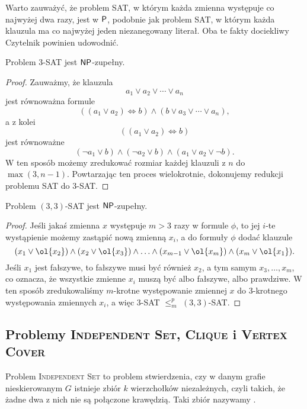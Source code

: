 Warto zauważyć, że problem SAT, w którym każda zmienna występuje co najwyżej dwa razy, jest w $\textsf{P}$, podobnie jak problem SAT, w którym każda klauzula ma co najwyżej jeden niezanegowany literał. Oba te fakty dociekliwy Czytelnik powinien udowodnić.

\begin{theorem}\label{t:3-SAT}
    Problem 3-SAT jest $\textsf{NP}$-zupełny.
\end{theorem}
\begin{proof}
    Zauważmy, że klauzula
    \[ a_1 \lor a_2 \lor \cdots \lor a_n \]
    jest równoważna formule
    \[ ((a_1 \lor a_2) \Leftrightarrow b) \land (b \lor a_3 \lor \cdots \lor a_n), \]
    a z kolei
    \[ ((a_1 \lor a_2) \Leftrightarrow b) \]
    jest równoważne
    \[ (\neg a_1 \lor b) \land (\neg a_2 \lor b) \land (a_1 \lor a_2 \lor \neg b). \]
    W ten sposób możemy zredukować rozmiar każdej klauzuli z $n$ do $\max(3, n-1)$. Powtarzając ten proces wielokrotnie, dokonujemy redukcji problemu SAT do 3-SAT.
\end{proof}

\begin{theorem}\label{t:3,3-SAT}
    Problem $(3, 3)$-SAT jest $\textsf{NP}$-zupełny.
\end{theorem}
\begin{proof}
    Jeśli jakaś zmienna $x$ występuje $m > 3$ razy w formule $\phi$, to jej $i$-te wystąpienie możemy zastąpić nową zmienną $x_i$, a do formuły $\phi$ dodać klauzule
    \[ (x_1 \lor \ol{x_2}) \land (x_2 \lor \ol{x_3}) \land \ldots \land (x_{m-1} \lor \ol{x_m}) \land (x_m \lor \ol{x_1}). \]
    Jeśli $x_1$ jest fałszywe, to fałszywe musi być również $x_2$, a tym samym $x_3, \ldots, x_m$, co oznacza, że wszystkie zmienne $x_i$ muszą być albo fałszywe, albo prawdziwe. W ten sposób zredukowaliśmy $m$-krotne występowanie zmiennej $x$ do 3-krotnego występowania zmiennych $x_i$, a więc 3-SAT $\leq_m^p$ $(3, 3)$-SAT.
\end{proof}

\subsection{Problemy \textsc{Independent Set}, \textsc{Clique} i \textsc{Vertex Cover}}

Problem \textsc{Independent Set} to problem stwierdzenia, czy w danym grafie nieskierowanym $G$ istnieje zbiór $k$ wierzchołków niezależnych, czyli takich, że żadne dwa z nich nie są połączone krawędzią. Taki zbiór nazywamy .

